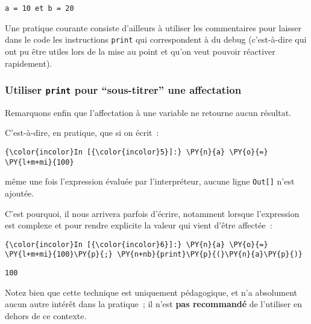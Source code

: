     \begin{Verbatim}[commandchars=\\\{\}]
a = 10 et b = 20

    \end{Verbatim}

    Une pratique courante consiste d'ailleurs à utiliser les commentaires
pour laisser dans le code les instructions \texttt{print} qui
correspondent à du debug (c'est-à-dire qui ont pu être utiles lors de la
mise au point et qu'on veut pouvoir réactiver rapidement).

    \hypertarget{utiliser-print-pour-sous-titrer-une-affectation}{%
\subsubsection{\texorpdfstring{Utiliser \texttt{print} pour
``sous-titrer'' une
affectation}{Utiliser print pour ``sous-titrer'' une affectation}}\label{utiliser-print-pour-sous-titrer-une-affectation}}

    Remarquons enfin que l'affectation à une variable ne retourne aucun
résultat.

C'est-à-dire, en pratique, que si on écrit~:

    \begin{Verbatim}[commandchars=\\\{\}]
{\color{incolor}In [{\color{incolor}5}]:} \PY{n}{a} \PY{o}{=} \PY{l+m+mi}{100}
\end{Verbatim}


    même une fois l'expression évaluée par l'interpréteur, aucune ligne
\texttt{Out{[}{]}} n'est ajoutée.

    C'est pourquoi, il nous arrivera parfois d'écrire, notamment lorsque
l'expression est complexe et pour rendre explicite la valeur qui vient
d'être affectée~:

    \begin{Verbatim}[commandchars=\\\{\}]
{\color{incolor}In [{\color{incolor}6}]:} \PY{n}{a} \PY{o}{=} \PY{l+m+mi}{100}\PY{p}{;} \PY{n+nb}{print}\PY{p}{(}\PY{n}{a}\PY{p}{)}
\end{Verbatim}


    \begin{Verbatim}[commandchars=\\\{\}]
100

    \end{Verbatim}

    Notez bien que cette technique est uniquement pédagogique, et n'a
absolument aucun autre intérêt dans la pratique~; il n'est \textbf{pas
recommandé} de l'utiliser en dehors de ce contexte.